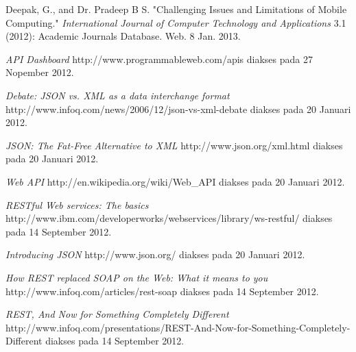 \documentclass[a4paper, 12pt]{report}
\begin{document}
\begin{thebibliography}{99}
\singlespacing 


Deepak, G., and Dr. Pradeep B S. "Challenging Issues and Limitations of Mobile Computing."
  \emph{International Journal of Computer Technology and Applications} 3.1 (2012): Academic Journals Database. Web. 8 Jan. 2013.

  \emph{API Dashboard}
  http://www.programmableweb.com/apis
  diakses pada 27 Nopember 2012.
  
  \emph{Debate: JSON vs. XML as a data interchange format}
  http://www.infoq.com/news/2006/12/json-vs-xml-debate
  diakses pada 20 Januari 2012.
  
  \emph{JSON: The Fat-Free Alternative to XML}
  http://www.json.org/xml.html
  diakses pada 20 Januari 2012.
  
  \emph{Web API}
  http://en.wikipedia.org/wiki/Web\_API
  diakses pada 20 Januari 2012.

  \emph{RESTful Web services: The basics}
  \\http://www.ibm.com/developerworks/webservices/library/ws-restful/
  diakses pada 14 September 2012.

  \emph{Introducing JSON} http://www.json.org/
  diakses pada 20 Januari 2012.
  
  \emph{How REST replaced SOAP on the Web: What it means to you}
  http://www.infoq.com/articles/rest-soap
  diakses pada 14 September 2012.
  
  \emph{REST, And Now for Something Completely Different}
  http://www.infoq.com/presentations/REST-And-Now-for-Something-Completely-Different
  diakses pada 14 September 2012.
 
\end{thebibliography}
\end{document}
